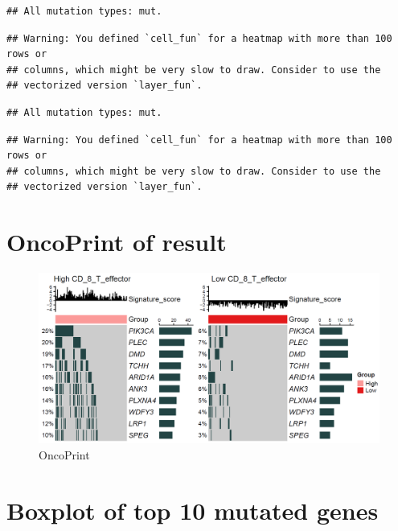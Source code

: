 \documentclass[
  12pt,
]{book}
\begin{document}
\begin{verbatim}
## All mutation types: mut.
\end{verbatim}

\begin{verbatim}
## Warning: You defined `cell_fun` for a heatmap with more than 100 rows or
## columns, which might be very slow to draw. Consider to use the
## vectorized version `layer_fun`.
\end{verbatim}

\begin{verbatim}
## All mutation types: mut.
\end{verbatim}

\begin{verbatim}
## Warning: You defined `cell_fun` for a heatmap with more than 100 rows or
## columns, which might be very slow to draw. Consider to use the
## vectorized version `layer_fun`.
\end{verbatim}

\hypertarget{oncoprint-of-result}{%
\section{OncoPrint of result}\label{oncoprint-of-result}}

\begin{figure}

{\centering \includegraphics[width=0.95\linewidth]{./fig/0-OncoPrint-CD_8_T_effector} 

}

\caption{OncoPrint}\label{fig:unnamed-chunk-4}
\end{figure}

\hypertarget{boxplot-of-top-10-mutated-genes}{%
\section{Boxplot of top 10 mutated genes}\label{boxplot-of-top-10-mutated-genes}}
\end{document}
